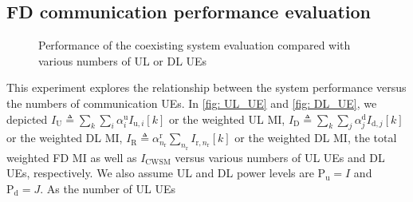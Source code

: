 \documentclass[9pt,journal]{IEEEtran}
\newcommand{\bracket}[1]{{\left [{#1}\right ]}}
\newcommand{\rr}{_\mathrm{r}}
\begin{document}
\subsection{FD communication performance evaluation}
\label{subsec: fd_comm_eva}
\begin{figure}[t]
\vspace{-1em}
\centering
{}
\hfil
{}
\caption{Performance of the coexisting system evaluation compared with various numbers of UL or DL UEs}
\label{fig: fd_UE}
\vspace{-1em}
\end{figure}
This experiment explores the relationship between the system performance versus the numbers of communication UEs. In \figurename{\ref{fig: UL_UE}} and \figurename{\ref{fig: DL_UE}}, we depicted $\mathit{I}_{\textrm{U}}\triangleq\sum_{k}\sum_{i}\alpha^\textrm{u}_i\mathit{I}_{\textrm{u},i}\bracket{k}$ or the weighted UL MI, $\mathit{I}_{\textrm{D}}\triangleq\sum_{k}\sum_{j}\alpha^\textrm{d}_j\mathit{I}_{\textrm{d},j}\bracket{k}$ or the weighted DL MI, $\mathit{I}_{\textrm{R}}\triangleq\alpha^\textrm{r}_{n\rr}\sum_{n\rr}\mathit{I}_{\textrm{r},n\rr}\bracket{k}$ or the weighted DL MI, the total weighted FD MI as well as $\mathit{I}_{\textrm{CWSM}}$ versus various numbers of UL UEs and DL UEs, respectively. We also assume UL and DL power levels are  $\mathrm{P}_{\textrm{u}}=I$ and $\mathrm{P}_{\textrm{d}}=J$. As the number of UL UEs 
\end{document}
